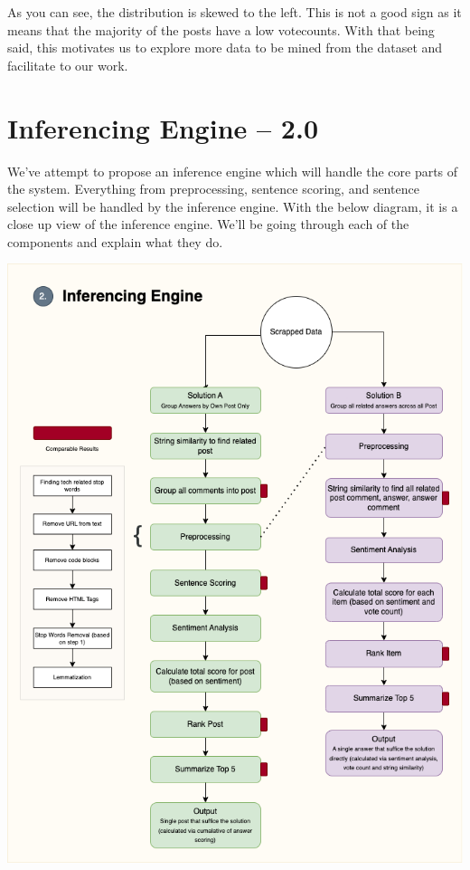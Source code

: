 As you can see, the distribution is skewed to the left. This is not a good sign as it means that the majority of the posts have a low votecounts. With that being said, this motivates us to explore more data to be mined from the dataset and facilitate to our work.

\section{Inferencing Engine -- 2.0}
We've attempt to propose an inference engine which will handle the core parts of the system. Everything from preprocessing, sentence scoring, and sentence selection will be handled by the inference engine. With the below diagram, it is a close up view of the inference engine. We'll be going through each of the components and explain what they do.

\noindent \includegraphics[scale=0.6]{inference-eng.png}\\

